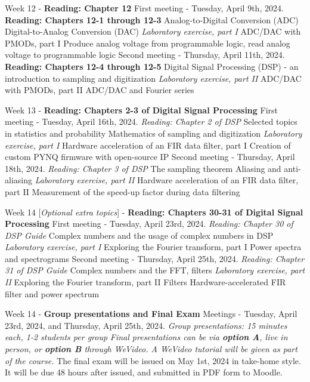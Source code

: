 \documentclass[10pt]{article}
\begin{document}
\begin{outline}[enumerate]
\1 Week 12 - \textbf{Reading: Chapter 12}
\2 First meeting - Tuesday, April 9th, 2024. \textbf{Reading: Chapters 12-1 through 12-3}
\3 Analog-to-Digital Conversion (ADC)
\3 Digital-to-Analog Conversion (DAC)
\3 \textit{Laboratory exercise, part I}
\4 ADC/DAC with PMODs, part I
\4 Produce analog voltage from programmable logic, read analog voltage to programmable logic
\2 Second meeting - Thursday, April 11th, 2024. \textbf{Reading: Chapters 12-4 through 12-5}
\3 Digital Signal Processing (DSP) - an introduction to sampling and digitization
\3 \textit{Laboratory exercise, part II}
\4 ADC/DAC with PMODs, part II
\4 ADC/DAC and Fourier series

\1 Week 13 - \textbf{Reading: Chapters 2-3 of Digital Signal Processing}
\2 First meeting - Tuesday, April 16th, 2024. \textit{Reading: Chapter 2 of DSP}
\3 Selected topics in statistics and probability
\3 Mathematics of sampling and digitization
\3 \textit{Laboratory exercise, part I}
\4 Hardware acceleration of an FIR data filter, part I
\4 Creation of custom PYNQ firmware with open-source IP
\2 Second meeting - Thursday, April 18th, 2024. \textit{Reading: Chapter 3 of DSP}
\3 The sampling theorem
\3 Aliasing and anti-aliasing
\3 \textit{Laboratory exercise, part II}
\4 Hardware acceleration of an FIR data filter, part II
\4 Measurement of the speed-up factor during data filtering

\1 Week 14 [\textit{Optional extra topics}] - \textbf{Reading: Chapters 30-31 of Digital Signal Processing}
\2 First meeting - Tuesday, April 23rd, 2024. \textit{Reading: Chapter 30 of DSP Guide}
\3 Complex numbers and the usage of complex numbers in DSP
\3 \textit{Laboratory exercise, part I}
\4 Exploring the Fourier transform, part I
\4 Power spectra and spectrograms
\2 Second meeting - Thursday, April 25th, 2024. \textit{Reading: Chapter 31 of DSP Guide}
\3 Complex numbers and the FFT, filters
\3 \textit{Laboratory exercise, part II}
\4 Exploring the Fourier transform, part II
\4 Filters
\4 Hardware-accelerated FIR filter and power spectrum

\1 Week 14 - \textbf{Group presentations and Final Exam}
\2 Meetings - Tuesday, April 23rd, 2024, and Thursday, April 25th, 2024.
\3 \textit{Group presentations: 15 minutes each, 1-2 students per group}
\3 \textit{Final presentations can be via \textbf{option A}, live in person, or \textbf{option B} through WeVideo. A WeVideo tutorial will be given as part of the course.}
\2 The final exam will be issued on May 1st, 2024 in take-home style.  It will be due 48 hours after issued, and submitted in PDF form to Moodle.
\end{outline}
\end{document}
